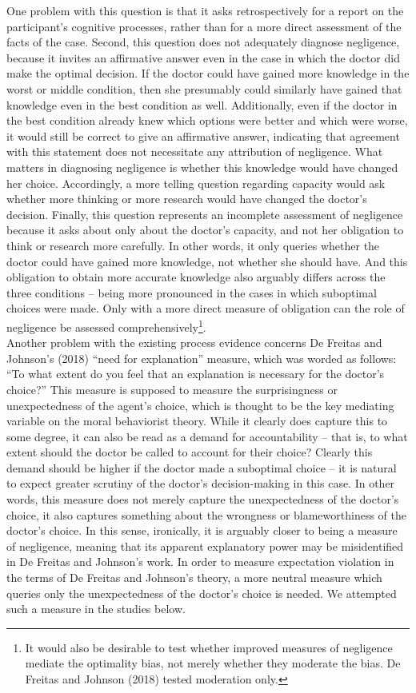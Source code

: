 \documentclass[
  man,floatsintext]{apa6}
\begin{document}
One problem with this question is that it asks retrospectively for a report on the participant's cognitive processes, rather than for a more direct assessment of the facts of the case. Second, this question does not adequately diagnose negligence, because it invites an affirmative answer even in the case in which the doctor did make the optimal decision. If the doctor could have gained more knowledge in the worst or middle condition, then she presumably could similarly have gained that knowledge even in the best condition as well. Additionally, even if the doctor in the best condition already knew which options were better and which were worse, it would still be correct to give an affirmative answer, indicating that agreement with this statement does not necessitate any attribution of negligence. What matters in diagnosing negligence is whether this knowledge would have changed her choice. Accordingly, a more telling question regarding capacity would ask whether more thinking or more research would have changed the doctor's decision. Finally, this question represents an incomplete assessment of negligence because it asks about only about the doctor's capacity, and not her obligation to think or research more carefully. In other words, it only queries whether the doctor could have gained more knowledge, not whether she should have. And this obligation to obtain more accurate knowledge also arguably differs across the three conditions -- being more pronounced in the cases in which suboptimal choices were made. Only with a more direct measure of obligation can the role of negligence be assessed comprehensively\footnote{It would also be desirable to test whether improved measures of negligence mediate the optimality bias, not merely whether they moderate the bias. De Freitas and Johnson (2018) tested moderation only.}.\\
Another problem with the existing process evidence concerns De Freitas and Johnson's (2018) ``need for explanation'' measure, which was worded as follows: ``To what extent do you feel that an explanation is necessary for the doctor's choice?'' This measure is supposed to measure the surprisingness or unexpectedness of the agent's choice, which is thought to be the key mediating variable on the moral behaviorist theory. While it clearly does capture this to some degree, it can also be read as a demand for accountability -- that is, to what extent should the doctor be called to account for their choice? Clearly this demand should be higher if the doctor made a suboptimal choice -- it is natural to expect greater scrutiny of the doctor's decision-making in this case. In other words, this measure does not merely capture the unexpectedness of the doctor's choice, it also captures something about the wrongness or blameworthiness of the doctor's choice. In this sense, ironically, it is arguably closer to being a measure of negligence, meaning that its apparent explanatory power may be misidentified in De Freitas and Johnson's work. In order to measure expectation violation in the terms of De Freitas and Johnson's theory, a more neutral measure which queries only the unexpectedness of the doctor's choice is needed. We attempted such a measure in the studies below.
\end{document}
